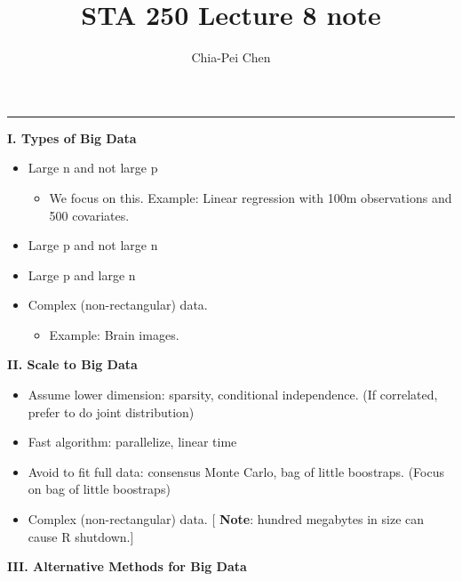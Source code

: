\documentclass[11pt]{article}
\title{\textbf{STA 250 Lecture 8 note}}
\date{}
\author{
        Chia-Pei Chen
}
\begin{document}
\maketitle
\noindent\rule{16cm}{0.4pt}

\vspace{0.5cm}
\noindent \textbf{\large{I. Types of Big Data}}\vspace{0.15cm}

\begin{itemize}
  \item Large n and not large p
    \begin{itemize}
      \item We focus on this. Example: Linear regression with 100m observations and 500 covariates.
    \end{itemize}
  \item Large p and not large n
  \item Large p and large n
  \item Complex (non-rectangular) data.
   \begin{itemize}
      \item Example: Brain images.
    \end{itemize}

\end{itemize}

\vspace{0.5cm}
\noindent \textbf{\large{II. Scale to Big Data}}\vspace{0.15cm}

\begin{itemize}
  \item Assume lower dimension: sparsity, conditional independence. (If correlated, prefer to do joint distribution)
  \item Fast algorithm: parallelize, linear time
  \item Avoid to fit full data: consensus Monte Carlo, bag of little boostraps. (Focus on bag of little boostraps)
  \item Complex (non-rectangular) data.
  [ \textbf{Note}: hundred megabytes in size can cause R shutdown.]

\end{itemize}

\vspace{0.5cm}
\noindent \textbf{\large{III. Alternative Methods for Big Data}}\vspace{0.15cm}
\end{document}
